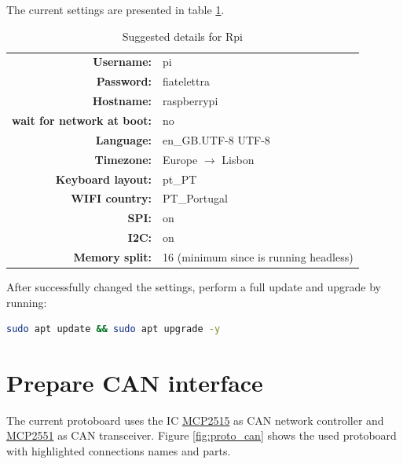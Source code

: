 The current settings are presented in table \ref{tab:suggested_config}. 

\begin{table}[h]
	\centering
	\begin{tabular}{rl}
		\toprule
		\textbf{Username:}& pi\\
		\textbf{Password:}& fiatelettra\\
		\textbf{Hostname:}& raspberrypi\\
		\textbf{wait for network at boot:}& no\\
		\textbf{Language:}& en\_GB.UTF-8 UTF-8\\
	    \textbf{Timezone:}& Europe $\rightarrow$ Lisbon\\
	    \textbf{Keyboard layout:}& pt\_PT\\
	    \textbf{WIFI country:}& PT\_Portugal\\
	    \textbf{SPI:}& on\\	
		\textbf{I2C:}& on\\
		\textbf{Memory split:}& 16 (minimum since is running headless)\\
		\bottomrule
	\end{tabular}
	\caption{Suggested details for \gls{Rpi}}
	\label{tab:suggested_config}
\end{table}

After successfully changed the settings, perform a full update and upgrade by running:
\begin{lstlisting}[frame=none,language=bash,backgroundcolor=\color{gray!15},numbers=none]
sudo apt update && sudo apt upgrade -y
\end{lstlisting}


\section{Prepare CAN interface}
\label{section:can}
The current protoboard uses the \gls{IC} \href{https://www.microchip.com/wwwproducts/en/MCP2515}{MCP2515} as \gls{CAN} network controller and \href{https://www.microchip.com/wwwproducts/en/MCP2551}{MCP2551} as \gls{CAN} transceiver. Figure \ref{fig:proto_can} shows the used protoboard with highlighted connections names and parts.

